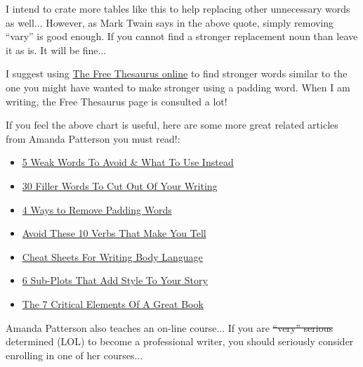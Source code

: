 \documentclass[openleft,oneside,showtrims]{memoir}
\begin{document}
I intend to crate more tables like this to help replacing other unnecessary words as well...
However, as Mark Twain says in the above quote, simply removing ``vary'' is good enough.  If you cannot find a stronger replacement noun than leave it as is.  It will be fine...

I suggest using \href{https://www.freethesaurus.com/}{The Free Thesaurus online} to find stronger words similar to the one you might have wanted to make stronger using a padding word. When I am writing, the Free Thesaurus page is consulted a lot!

If you feel the above chart is useful, here are some more great related articles from Amanda Patterson you must read!:

\begin{itemize}
\item \href{https://www.writerswrite.co.za/5-weak-words-to-avoid-and-what-to-use-instead/}{5 Weak Words To Avoid \& What To Use Instead}

\item \href{https://www.writerswrite.co.za/30-filler-words-you-can-cut-out-of-your-writing-infographic/}{30 Filler Words To Cut Out Of Your Writing}

\item \href{https://www.writerswrite.co.za/four-ways-to-remove-words-that-add-nothing-to-your-writing/}{4 Ways to Remove Padding Words}

\item \href{https://www.writerswrite.co.za/avoid-these-10-verbs-that-make-you-tell/}{Avoid These 10 Verbs That Make You Tell}

\item \href{https://www.writerswrite.co.za/cheat-sheets-for-writing-body-language/}{Cheat Sheets For Writing Body Language}

\item \href{https://www.writerswrite.co.za/six-sub-plots-that-add-style-to-your-story/}{6 Sub-Plots That Add Style To Your Story}

\item \href{https://www.writerswrite.co.za/the-7-critical-elements-of-a-great-book/}{The 7 Critical Elements Of A Great Book}
\end{itemize}

Amanda Patterson also teaches an on-line course...  If you are \sout{``very'' serious} determined (LOL) to become a professional writer, you should seriously consider enrolling in one of her courses...
\end{document}
